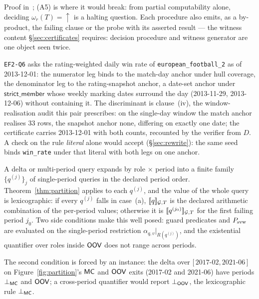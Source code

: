 \noindent{} Proof in~\cite{asofgov-tr}; (A5) is where it would break: from
partial computability alone, deciding $\omega_r(T)=\uparrow$ is a halting
question. Each procedure also emits, as a by-product, the failing
clause or the probe with its asserted result --- the witness content
\S\ref{sec:certificates} requires: decision procedure and witness
generator are one object seen twice.

\begin{example}
\label{ex:symdiff}
\texttt{EF2-Q6} asks the rating-weighted daily win rate of
\texttt{european\_\allowbreak football\_2} as of 2013-12-01: the numerator
leg binds to the match-day anchor under hull coverage, the denominator leg
to the rating-snapshot anchor, a date-set anchor under
$\mathsf{strict\_member}$ whose weekly marking dates surround the day
(2013-11-29, 2013-12-06) without containing it. The discriminant is
clause~(iv), the window-realisation audit this pair prescribes: on the
single-day window the match anchor realises 33 rows, the snapshot anchor
none, differing on exactly one date; the certificate carries 2013-12-01
with both counts, recounted by the verifier from $D$. A check on the
rule \emph{literal} alone would accept (\S\ref{sec:rewrite}): the same seed binds
\texttt{win\_\allowbreak rate} under that literal with both legs on one
anchor.
\end{example}

\begin{corollary}
\label{cor:multi}
 A delta or multi-period query expands by role $\times$ period into a finite
family $\{q^{(j)}\}_j$ of single-period queries in the declared period order.
Theorem~\ref{thm:partition} applies to each $q^{(j)}$, and the value of the
whole query is lexicographic: if every $q^{(j)}$ falls in case~(a),
$[\![q]\!]_{\mathcal{G},T}$ is the declared arithmetic combination of the per-period
values; otherwise it is $[\![q^{(j_0)}]\!]_{\mathcal{G},T}$ for the first failing
period $j_0$. Two side conditions make this well posed: guard predicates and
$P_{\mathrm{svw}}$ are evaluated on the single-period restriction
$\alpha_{q,v}|_{R(q^{(j)})}$, and the existential quantifier over roles inside
$\mathsf{OOV}$ does not range across periods.
\end{corollary}

 The second condition is forced by an instance: the delta over
$[\,2017\text{-}02,$\linebreak[0] $2021\text{-}06\,]$ on
Figure~\ref{fig:partition}'s $\mathsf{MC}$ and $\mathsf{OOV}$ exits (2017-02 and 2021-06)
have periods $\bot_{\mathsf{MC}}$ and
$\mathsf{OOV}$; a cross-period quantifier would report $\bot_{\mathsf{OOV}}$, the
lexicographic rule $\bot_{\mathsf{MC}}$.

